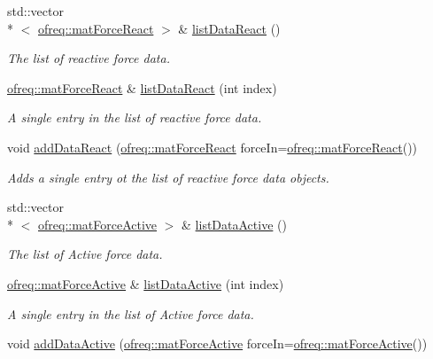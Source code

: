 \begin{DoxyCompactItemize}
std\-::vector\\*
$<$ \hyperlink{classosea_1_1ofreq_1_1mat_force_react}{ofreq\-::mat\-Force\-React} $>$ \& \hyperlink{classosea_1_1ofreq_1_1hydro_data_a8c1b66da5621a45f88fe65e4fc2e848e}{list\-Data\-React} ()
\begin{DoxyCompactList}\small\item\em The list of reactive force data. \end{DoxyCompactList}\item 
\hyperlink{classosea_1_1ofreq_1_1mat_force_react}{ofreq\-::mat\-Force\-React} \& \hyperlink{classosea_1_1ofreq_1_1hydro_data_a25218fa0280509bd46d55ca0e53db350}{list\-Data\-React} (int index)
\begin{DoxyCompactList}\small\item\em A single entry in the list of reactive force data. \end{DoxyCompactList}\item 
void \hyperlink{classosea_1_1ofreq_1_1hydro_data_a0fc3dd79620d5be383075cd29f35f760}{add\-Data\-React} (\hyperlink{classosea_1_1ofreq_1_1mat_force_react}{ofreq\-::mat\-Force\-React} force\-In=\hyperlink{classosea_1_1ofreq_1_1mat_force_react}{ofreq\-::mat\-Force\-React}())
\begin{DoxyCompactList}\small\item\em Adds a single entry ot the list of reactive force data objects. \end{DoxyCompactList}\item 
std\-::vector\\*
$<$ \hyperlink{classosea_1_1ofreq_1_1mat_force_active}{ofreq\-::mat\-Force\-Active} $>$ \& \hyperlink{classosea_1_1ofreq_1_1hydro_data_ac92ec2a314b592d91ea8437d3cb5c211}{list\-Data\-Active} ()
\begin{DoxyCompactList}\small\item\em The list of Active force data. \end{DoxyCompactList}\item 
\hyperlink{classosea_1_1ofreq_1_1mat_force_active}{ofreq\-::mat\-Force\-Active} \& \hyperlink{classosea_1_1ofreq_1_1hydro_data_ae7a9a88e6aaf386d1f04669ef2039ab2}{list\-Data\-Active} (int index)
\begin{DoxyCompactList}\small\item\em A single entry in the list of Active force data. \end{DoxyCompactList}\item 
void \hyperlink{classosea_1_1ofreq_1_1hydro_data_aa5a9412a59f440ec55d95f57de913187}{add\-Data\-Active} (\hyperlink{classosea_1_1ofreq_1_1mat_force_active}{ofreq\-::mat\-Force\-Active} force\-In=\hyperlink{classosea_1_1ofreq_1_1mat_force_active}{ofreq\-::mat\-Force\-Active}())

\end{DoxyCompactItemize}
